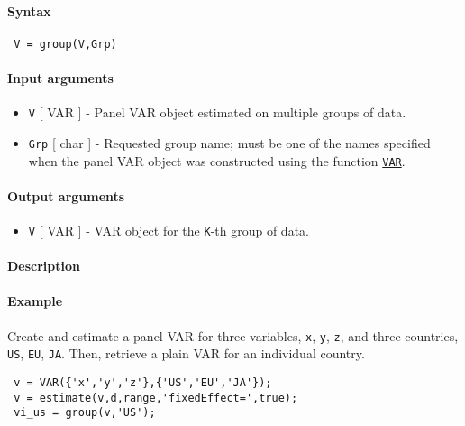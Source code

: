 


	\paragraph{Syntax}
 
 \begin{verbatim}
 V = group(V,Grp)
 \end{verbatim}
 
 \paragraph{Input arguments}
 
 \begin{itemize}
 \item
   \texttt{V} {[} VAR {]} - Panel VAR object estimated on multiple groups
   of data.
 \item
   \texttt{Grp} {[} char {]} - Requested group name; must be one of the
   names specified when the panel VAR object was constructed using the
   function \href{VAR/VAR}{\texttt{VAR}}.
 \end{itemize}
 
 \paragraph{Output arguments}
 
 \begin{itemize}
 \item
   \texttt{V} {[} VAR {]} - VAR object for the \texttt{K}-th group of
   data.
 \end{itemize}
 
 \paragraph{Description}
 
 \paragraph{Example}
 
 Create and estimate a panel VAR for three variables, \texttt{x},
 \texttt{y}, \texttt{z}, and three countries, \texttt{US}, \texttt{EU},
 \texttt{JA}. Then, retrieve a plain VAR for an individual country.
 
 \begin{verbatim}
 v = VAR({'x','y','z'},{'US','EU','JA'});
 v = estimate(v,d,range,'fixedEffect=',true);
 vi_us = group(v,'US');
 \end{verbatim}


